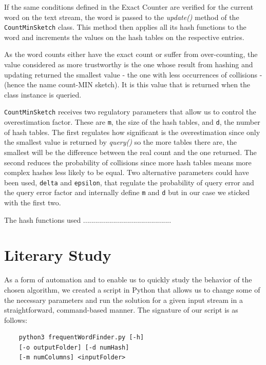 \documentclass[shortpaper]{revdetua}
\begin{document}
If the same conditions defined in the Exact Counter are verified for the current word on the text stream, the word is passed to the \textit{update()} method of 
the \texttt{CountMinSketch} class.
This method then applies all its hash functions to the word and increments the values on the hash tables on the respective entries.

As the word counts either have the exact count or suffer from over-counting, the value considered as more trustworthy is the one whose result from hashing and 
updating returned the smallest value - the one with less occurrences of collisions - (hence the name count-MIN sketch).
It is this value that is returned when the class instance is queried.

\texttt{CountMinSketch} receives two regulatory parameters that allow us to control the overestimation factor.
These are \texttt{m}, the size of the hash tables, and \texttt{d}, the number of hash tables.
The first regulates how significant is the overestimation since only the smallest value is returned by \textit{query()} so the more tables there are, the 
smallest will be the difference between the real count and the one returned.
The second reduces the probability of collisions since more hash tables means more complex hashes less likely to be equal.
Two alternative parameters could have been used, \texttt{delta} and \texttt{epsilon}, that regulate the probability of query error and the query error factor 
and internally define \texttt{m} and \texttt{d} but in our case we sticked with the first two.

The hash functions used ............................................

\section{Literary Study} %

As a form of automation and to enable us to quickly study the behavior of the chosen algorithm, we created a script in Python that allows us to change some of 
the necessary parameters and run the solution for a given input stream in a straightforward, command-based manner.
The signature of our script is as follows:

\vspace{-5pt}
\begin{center}
    \begin{verbatim}
    python3 frequentWordFinder.py [-h]
    [-o outputFolder] [-d numHash] 
    [-m numColumns] <inputFolder>
    \end{verbatim}
\end{center}
\vspace{-15pt}
\end{document}
